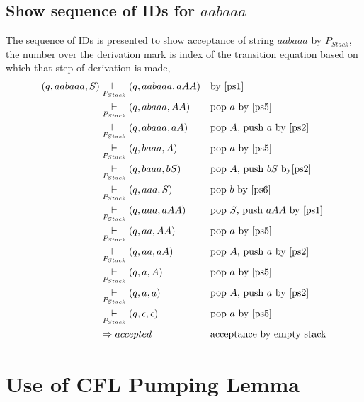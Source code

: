 \documentclass[11pt,a4paper]{article}
\newcommand{\htab}{\hspace*{0.63cm}}
\newcommand{\ps}{P_{Stack}}
\newcommand{\pdaid}[2]{(q, #1, #2)}
\newcommand{\idDerive}[1]{\underset{\ps}{\vdash}}
\begin{document}
\subsection{Show sequence of IDs for $aabaaa$}
\htab The sequence of IDs is presented to show acceptance of string $aabaaa$ by $\ps$, the number over the derivation mark is index of the transition equation based on which that step of derivation is made,
\begin{align}
    \pdaid{aabaaa}{S} 
    & \idDerive{\eqref{ps1}} \pdaid{aabaaa}{aAA} &&\mbox{by \eqref{ps1}} \\
    & \idDerive{\eqref{ps5}} \pdaid{abaaa}{AA} &&\mbox{pop $a$ by \eqref{ps5}}\\
    & \idDerive{\eqref{ps4}} \pdaid{abaaa}{aA} &&\mbox{pop $A$, push $a$ by \eqref{ps2}}\\
    & \idDerive{\eqref{ps5}} \pdaid{baaa}{A} &&\mbox{pop $a$ by \eqref{ps5}} \\
    & \idDerive{\eqref{ps3}} \pdaid{baaa}{bS} &&\mbox{pop $A$, push $bS$ by\eqref{ps2}}\\
    & \idDerive{\eqref{ps6}} \pdaid{aaa}{S} &&\mbox{pop $b$ by \eqref{ps6}} \\
    & \idDerive{\eqref{ps1}} \pdaid{aaa}{aAA} &&\mbox{pop $S$, push $aAA$ by \eqref{ps1}} \\
    & \idDerive{\eqref{ps5}} \pdaid{aa}{AA} &&\mbox{pop $a$ by \eqref{ps5}} \\
    & \idDerive{\eqref{ps4}} \pdaid{aa}{aA} &&\mbox{pop $A$, push $a$ by \eqref{ps2}}\\
    & \idDerive{\eqref{ps5}} \pdaid{a}{A} &&\mbox{pop $a$ by \eqref{ps5}} \\
    & \idDerive{\eqref{ps4}} \pdaid{a}{a} &&\mbox{pop $A$, push $a$ by \eqref{ps2}}\\
    & \idDerive{\eqref{ps5}} \pdaid{\epsilon}{\epsilon} &&\mbox{pop $a$ by \eqref{ps5}} \\
    & \Rightarrow accepted &&\mbox{acceptance by empty stack}
\end{align}
\newpage

\section{Use of CFL Pumping Lemma}
\end{document}
